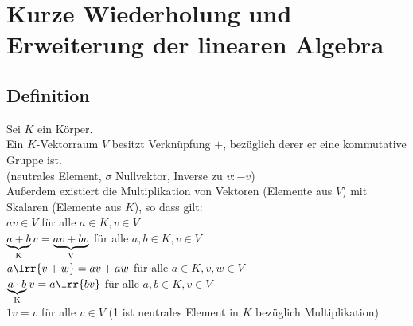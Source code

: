 \newpage
\section{Kurze Wiederholung und Erweiterung der linearen Algebra}
\subsection{Definition}
	Sei $K$ ein Körper.\\
	Ein $K$-Vektorraum $V$ besitzt Verknüpfung $+$, bezüglich derer er eine kommutative Gruppe ist.\\
	(neutrales Element, $\sigma$ Nullvektor, Inverse zu $v:-v$)\\
	Außerdem existiert die Multiplikation von Vektoren (Elemente aus $V$) mit Skalaren (Elemente aus $K$), so dass gilt:\\
	$av\in V$ für alle $a\in K, v\in V$\\
	$\underbrace{a+b}_{\mbox{\scriptsize K}}v=\underbrace{av+bv}_{\mbox{\scriptsize V}}$ für alle $a,b\in K, v\in V$\\
	$a\lrr{v+w}=av+aw$ für alle $a\in K,v,w\in V$\\
	$\underbrace{a\cdot b}_{\mbox{\scriptsize K}}v=a\lrr{bv}$ für alle $a,b\in K, v\in V$\\
	$1v=v$ für alle $v\in V$ (1 ist neutrales Element in $K$ bezüglich Multiplikation)